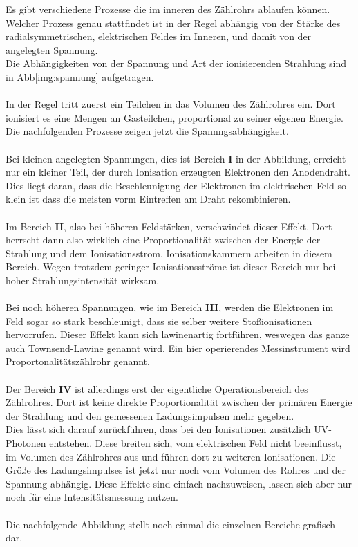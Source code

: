 \noindent
Es gibt verschiedene Prozesse die im inneren des Zählrohrs ablaufen können. 
Welcher Prozess genau stattfindet ist in der Regel abhängig von der Stärke des radialsymmetrischen, elektrischen Feldes im Inneren, und damit von der angelegten Spannung.\\
Die Abhängigkeiten von der Spannung und Art der ionisierenden Strahlung sind in Abb\ref{img:spannung} aufgetragen.\\\\
In der Regel tritt zuerst ein Teilchen in das Volumen des Zählrohres ein. Dort ionisiert es eine Mengen an Gasteilchen, proportional zu seiner eigenen Energie.\\
Die nachfolgenden Prozesse zeigen jetzt die Spannngsabhängigkeit.\\\\
Bei kleinen angelegten Spannungen, dies ist Bereich \textbf{I} in der Abbildung, erreicht nur ein kleiner Teil, der durch Ionisation erzeugten Elektronen den Anodendraht. 
Dies liegt daran, dass die Beschleunigung der Elektronen im elektrischen Feld so klein ist dass die meisten vorm Eintreffen am Draht rekombinieren. \\\\
Im Bereich \textbf{II}, also bei höheren Feldstärken, verschwindet dieser Effekt. Dort herrscht dann also wirklich eine Proportionalität zwischen der Energie der Strahlung und dem Ionisationsstrom.
Ionisationskammern arbeiten in diesem Bereich. Wegen trotzdem geringer Ionisationsströme ist dieser Bereich nur bei hoher Strahlungsintensität wirksam.\\\\
Bei noch höheren Spannungen, wie im Bereich \textbf{III}, werden die Elektronen im Feld sogar so stark beschleunigt, dass sie selber weitere Stoßionisationen hervorrufen.
Dieser Effekt kann sich lawinenartig fortführen, weswegen das ganze auch Townsend-Lawine genannt wird. 
Ein hier operierendes Messinstrument wird Proportonalitätszählrohr genannt.\\\\
Der Bereich \textbf{IV} ist allerdings erst der eigentliche Operationsbereich des Zählrohres. 
Dort ist keine direkte Proportionalität zwischen der primären Energie der Strahlung und den gemessenen Ladungsimpulsen mehr gegeben.\\
Dies lässt sich darauf zurückführen, dass bei den Ionisationen zusätzlich UV-Photonen entstehen.
Diese breiten sich, vom elektrischen Feld nicht beeinflusst, im Volumen des Zählrohres aus und führen dort zu weiteren Ionisationen.
Die Größe des Ladungsimpulses ist jetzt nur noch vom Volumen des Rohres und der Spannung abhängig.
Diese Effekte sind einfach nachzuweisen, lassen sich aber nur noch für eine Intensitätsmessung nutzen.\\\\
Die nachfolgende Abbildung stellt noch einmal die einzelnen Bereiche grafisch dar.


